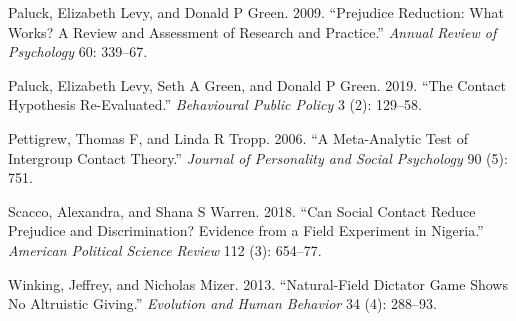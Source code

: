 \documentclass[
]{article}
\newlength{\cslhangindent}
\newlength{\cslentryspacingunit} %
\newenvironment{CSLReferences}[2] %
 {%
  \setlength{\parindent}{0pt}
  \ifodd #1
  \let\oldpar\par
  \def\par{\hangindent=\cslhangindent\oldpar}
  \fi
  \setlength{\parskip}{#2\cslentryspacingunit}
 }%
 {}
\begin{document}
\begin{CSLReferences}{1}{0}
\leavevmode{}%
Paluck, Elizabeth Levy, and Donald P Green. 2009. {``Prejudice
Reduction: What Works? A Review and Assessment of Research and
Practice.''} \emph{Annual Review of Psychology} 60: 339--67.

\leavevmode{}%
Paluck, Elizabeth Levy, Seth A Green, and Donald P Green. 2019. {``The
Contact Hypothesis Re-Evaluated.''} \emph{Behavioural Public Policy} 3
(2): 129--58.

\leavevmode{}%
Pettigrew, Thomas F, and Linda R Tropp. 2006. {``A Meta-Analytic Test of
Intergroup Contact Theory.''} \emph{Journal of Personality and Social
Psychology} 90 (5): 751.

\leavevmode{}%
Scacco, Alexandra, and Shana S Warren. 2018. {``Can Social Contact
Reduce Prejudice and Discrimination? Evidence from a Field Experiment in
Nigeria.''} \emph{American Political Science Review} 112 (3): 654--77.

\leavevmode{}%
Winking, Jeffrey, and Nicholas Mizer. 2013. {``Natural-Field Dictator
Game Shows No Altruistic Giving.''} \emph{Evolution and Human Behavior}
34 (4): 288--93.

\end{CSLReferences}
\end{document}
